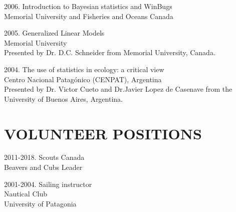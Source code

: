 \documentclass{res}
\begin{document}
\begin{resume}
\begin{hangparas}{.4in}{1}
2006. Introduction to Bayesian statistics and WinBugs\\
Memorial University and Fisheries and Oceans Canada 

2005. Generalized Linear Models\\
Memorial University\\
Presented by Dr. D.C. Schneider from Memorial University, Canada.

2004. The use of statistics in ecology: a critical view  \\
Centro Nacional Patag\'{o}nico (CENPAT), Argentina\\
Presented by Dr. Victor Cueto and Dr.Javier Lopez de Casenave from the University of Buenos Aires, Argentina.

\end{hangparas}

\section{VOLUNTEER POSITIONS}
\vspace{0.2in}
\begin{hangparas}{.9in}{1}
2011-2018. Scouts Canada	\\	
Beavers and Cubs Leader

2001-2004. Sailing instructor \\
Nautical Club\\
University of Patagonia
\end{hangparas}




\end{resume}
\end{document}
